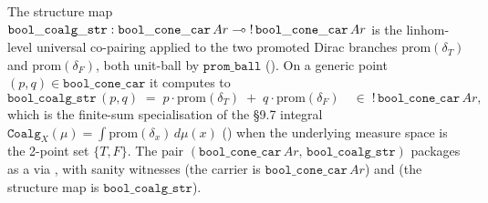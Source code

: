 \begin{definition}\label{def:cbv-bool-cone-coalg}
\rocqok
{}\rocqok
{}
The structure map
$\mathtt{bool\_coalg\_str} : \mathtt{bool\_cone\_car}\,Ar
\multimap \mathord{!}\,\mathtt{bool\_cone\_car}\,Ar$
is the linhom-level universal co-pairing
applied to the two promoted Dirac branches
$\mathrm{prom}(\delta_T)$ and $\mathrm{prom}(\delta_F)$, both unit-ball
by $\mathtt{prom\_ball}$ (). On a
generic point $(p, q) \in \mathtt{bool\_cone\_car}$ it computes to
\[
  \mathtt{bool\_coalg\_str}\,(p, q)
  \;=\;
  p \cdot \mathrm{prom}(\delta_T)
  \;+\;
  q \cdot \mathrm{prom}(\delta_F)
  \quad\in\;
  \mathord{!}\,\mathtt{bool\_cone\_car}\,Ar,
\]
which is the finite-sum specialisation of the \S9.7 integral
$\mathtt{Coalg}_X(\mu) = \int \mathrm{prom}(\delta_x)\,d\mu(x)$
() when the underlying
measure space is the 2-point set $\{T, F\}$. The pair
$(\mathtt{bool\_cone\_car}\,Ar,\,\mathtt{bool\_coalg\_str})$ packages
as a  via
, with sanity
witnesses
 (the
carrier is $\mathtt{bool\_cone\_car}\,Ar$) and
 (the
structure map is $\mathtt{bool\_coalg\_str}$).
\end{definition}

